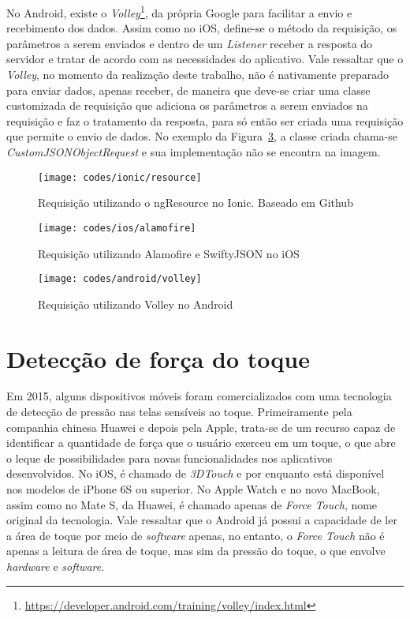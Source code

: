 No Android, existe o \textit{Volley}\footnote{\url{https://developer.android.com/training/volley/index.html}}, da própria Google para facilitar a envio e recebimento dos dados. Assim como no iOS, define-se o método da 
requisição, os parâmetros a serem enviados e dentro de um \textit{Listener} receber a resposta do servidor e tratar de acordo com as necessidades do aplicativo. Vale ressaltar que o \textit{Volley}, no momento da realização
deste trabalho, não é nativamente preparado para enviar dados, apenas receber, de maneira que deve-se criar uma classe customizada de requisição que adiciona os parâmetros a serem enviados na requisição e faz o tratamento da
resposta, para só então ser criada uma requisição que permite o envio de dados. No exemplo da Figura~\ref{fig:volley-android}, a classe criada chama-se \textit{CustomJSONObjectRequest} e sua implementação não se encontra 
na imagem.

\begin{figure}[H]
	\centering
	\texttt{[image: codes/ionic/resource]}
	\caption[Requisição utilizando o ngResource no Ionic]{Requisição utilizando o ngResource no Ionic. Baseado em Github\protect\footnotemark}
	\label{fig:resource-ionic}
\end{figure}
\begin{figure}[H]
	\centering
	\texttt{[image: codes/ios/alamofire]}
	\caption[Requisição utilizando Alamofire e SwiftyJSON no iOS]{Requisição utilizando Alamofire e SwiftyJSON no iOS}
	\label{fig:alamofire-ios}
\end{figure} 
\begin{figure}[H]
	\centering
	\texttt{[image: codes/android/volley]}
	\caption[Requisição utilizando Volley no Android]{Requisição utilizando Volley no Android}
	\label{fig:volley-android}
\end{figure}


\section{Detecção de força do toque} \label{subsubsec:forcetouch}
Em 2015, alguns dispositivos móveis foram comercializados com uma tecnologia de detecção de pressão nas telas sensíveis ao toque. Primeiramente pela companhia chinesa Huawei e depois pela Apple, trata-se de um recurso 
capaz de identificar a quantidade de força que o usuário exerceu em um toque, o que abre o leque de possibilidades para novas funcionalidades nos aplicativos desenvolvidos. 
No iOS, é chamado de \textit{3DTouch} e por enquanto está disponível nos modelos de iPhone 6S ou superior. No Apple Watch e no novo MacBook, assim como no Mate S, da Huawei, é chamado apenas de \textit{Force Touch}, 
nome original da tecnologia. 
Vale ressaltar que o Android já possui a capacidade de ler a área de toque por meio de \textit{software} apenas, no entanto, o \textit{Force Touch} não é apenas a leitura de área de toque, mas sim da pressão do toque,
o que envolve \textit{hardware} e \textit{software}.

